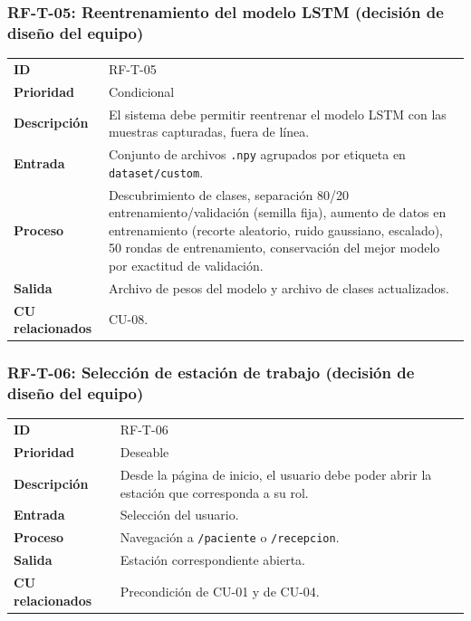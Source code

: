 \subsubsection{RF-T-05: Reentrenamiento del modelo LSTM (decisión de diseño del equipo)}
\begin{table}[H]
\centering
\begin{tabularx}{\textwidth}{l X}
\toprule
\textbf{ID} & RF-T-05 \\
\textbf{Prioridad} & Condicional \\
\textbf{Descripción} & El sistema debe permitir reentrenar el modelo LSTM con las muestras capturadas, fuera de línea. \\
\textbf{Entrada} & Conjunto de archivos \texttt{.npy} agrupados por etiqueta en \texttt{dataset/custom}. \\
\textbf{Proceso} & Descubrimiento de clases, separación 80/20 entrenamiento/validación (semilla fija), aumento de datos en entrenamiento (recorte aleatorio, ruido gaussiano, escalado), 50 rondas de entrenamiento, conservación del mejor modelo por exactitud de validación. \\
\textbf{Salida} & Archivo de pesos del modelo y archivo de clases actualizados. \\
\textbf{CU relacionados} & CU-08. \\
\bottomrule
\end{tabularx}
\end{table}

\subsubsection{RF-T-06: Selección de estación de trabajo (decisión de diseño del equipo)}
\begin{table}[H]
\centering
\begin{tabularx}{\textwidth}{l X}
\toprule
\textbf{ID} & RF-T-06 \\
\textbf{Prioridad} & Deseable \\
\textbf{Descripción} & Desde la página de inicio, el usuario debe poder abrir la estación que corresponda a su rol. \\
\textbf{Entrada} & Selección del usuario. \\
\textbf{Proceso} & Navegación a \texttt{/paciente} o \texttt{/recepcion}. \\
\textbf{Salida} & Estación correspondiente abierta. \\
\textbf{CU relacionados} & Precondición de CU-01 y de CU-04. \\
\bottomrule
\end{tabularx}
\end{table}

